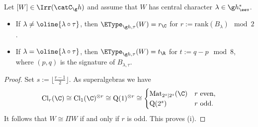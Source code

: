 \documentclass[12pt]{amsart}
\begin{document}
\begin{prp}
\label{prp:ETClp,q}
Let $[W]\in\Irr(\catC_\g h)$ and assume that $W$ has  central character $\lambda\in\g h_\eev^*$.
\begin{itemize}
\item[\rm (i)] If $\lambda\neq \oline{\lambda\circ\tau}$, then $\EType_{\g h,\tau}(W)=r_\C$ for $r:=\mathrm{rank}(B_\lambda)\mod 2$. 
\item[\rm (ii)]
If $\lambda=\oline{\lambda\circ\tau}$, then $\EType_{{\g h,\tau}}(W)=t_\R$ for 
$t:=q-p\mod 8$, where $(p,q)$ is the signature of $B_{\lambda,\tau}$.  
\end{itemize}
\end{prp}
\begin{proof}
Set $s:={\lfloor\frac{r-1}{2}\rfloor}$. As superalgebras we have 
\begin{equation}
\label{eq:Cl_r}
\mathrm{Cl}_r(\C)\cong \mathrm{Cl}_1(\C)^{\otimes r}\cong\mathrm{Q}(1)^{\otimes r}\cong
\begin{cases}
\mathrm{Mat}_{2^s|2^s}(\C)&r\text{ even},\\
\mathrm{Q}(2^s)&r\text{ odd}.
\end{cases}
\end{equation}
It follows that $W\cong \Pi W$ if and only if $r$ is odd. This proves (i).


\end{proof}
\end{document}
